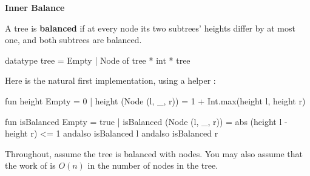 
\newpage
{}

\textbf{Inner Balance}

A tree is \textbf{balanced} if at every node its two subtrees' heights differ by
at most one, and both subtrees are balanced.
\begin{codeblock}
  datatype tree = Empty | Node of tree * int * tree
\end{codeblock}

Here is the natural first implementation, using a helper :
\begin{codeblock}
  fun height Empty = 0
    | height (Node (l, _, r)) = 1 + Int.max(height l, height r)

  fun isBalanced Empty = true
    | isBalanced (Node (l, _, r)) =
        abs (height l - height r) <= 1
        andalso isBalanced l
        andalso isBalanced r
\end{codeblock}

Throughout, assume the tree is balanced with  nodes. You may
also assume that the work of  is $O(n)$ in the number of
nodes in the tree.

